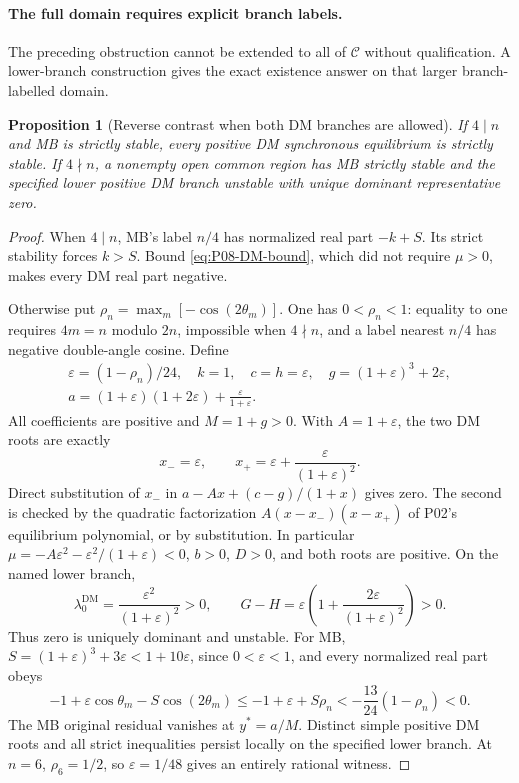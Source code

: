 \documentclass[11pt]{article}
\newcommand{\DM}{\mathrm{DM}}
\newtheorem{proposition}[theorem]{Proposition}
\theoremstyle{definition}
\theoremstyle{remark}
\begin{document}
\paragraph{The full domain requires explicit branch labels.}
The preceding obstruction cannot be extended to all of $\mathcal C$
without qualification. A lower-branch construction gives the exact
existence answer on that larger branch-labelled domain.
\begin{proposition}[Reverse contrast when both DM branches are allowed]
\label{prop:P08-lower}
If $4\mid n$ and MB is strictly stable, every positive DM synchronous
equilibrium is strictly stable. If $4\nmid n$, a nonempty open common
region has MB strictly stable and the specified lower positive DM
branch unstable with unique dominant representative zero.
\end{proposition}
\begin{proof}
When $4\mid n$, MB's label $n/4$ has normalized real part $-k+S$.
Its strict stability forces $k>S$. Bound \eqref{eq:P08-DM-bound},
which did not require $\mu>0$, makes every DM real part negative.

Otherwise put $\rho_n=\max_m[-\cos(2\theta_m)]$. One has
$0<\rho_n<1$: equality to one requires $4m=n$ modulo $2n$, impossible
when $4\nmid n$, and a label nearest $n/4$ has negative double-angle
cosine. Define
\begin{equation}
\begin{gathered}
 \varepsilon=(1-\rho_n)/24,\quad k=1,\quad c=h=\varepsilon,\quad
 g=(1+\varepsilon)^3+2\varepsilon,\\
 a=(1+\varepsilon)(1+2\varepsilon)
                         +\frac{\varepsilon}{1+\varepsilon}.
\end{gathered}\label{eq:P08-lower-family}
\end{equation}
All coefficients are positive and $M=1+g>0$. With $A=1+\varepsilon$,
the two DM roots are exactly
\[
 x_-=\varepsilon,\qquad
 x_+=\varepsilon+\frac{\varepsilon}{(1+\varepsilon)^2}.
\]
Direct substitution of $x_-$ in $a-Ax+(c-g)/(1+x)$ gives zero.
The second is checked by the quadratic factorization
$A(x-x_-)(x-x_+)$ of P02's equilibrium polynomial, or by substitution.
In particular $\mu=-A\varepsilon^2-\varepsilon^2/(1+\varepsilon)<0$,
$b>0$, $D>0$, and both roots are positive. On the named lower branch,
\[
 \lambda_0^{\DM}=\frac{\varepsilon^2}{(1+\varepsilon)^2}>0,
 \qquad G-H=\varepsilon\left(1+
                       \frac{2\varepsilon}{(1+\varepsilon)^2}\right)>0.
\]
Thus zero is uniquely dominant and unstable. For MB,
$S=(1+\varepsilon)^3+3\varepsilon<1+10\varepsilon$, since
$0<\varepsilon<1$, and every normalized real part obeys
\[
 -1+\varepsilon\cos\theta_m-S\cos(2\theta_m)
 \le-1+\varepsilon+S\rho_n
 <-\frac{13}{24}(1-\rho_n)<0.
\]
The MB original residual vanishes at $y^*=a/M$. Distinct simple
positive DM roots and all strict inequalities persist locally on the
specified lower branch. At $n=6$, $\rho_6=1/2$, so
$\varepsilon=1/48$ gives an entirely rational witness.
\end{proof}
\end{document}
